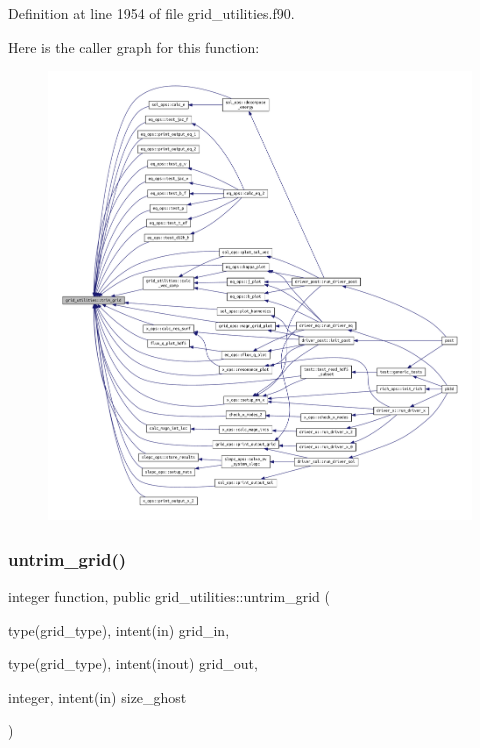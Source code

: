 Definition at line 1954 of file grid\+\_\+utilities.\+f90.

Here is the caller graph for this function\+:
\nopagebreak
\begin{figure}[H]
\begin{center}
\leavevmode
\includegraphics[width=350pt]{namespacegrid__utilities_a67001ff9bbcad707aacf17f90a748d90_icgraph}
\end{center}
\end{figure}
\mbox{\label{namespacegrid__utilities_a4679f24af8e02793070f4e27b43e00b6}} 
\subsubsection{\texorpdfstring{untrim\+\_\+grid()}{untrim\_grid()}}
{\footnotesize\ttfamily integer function, public grid\+\_\+utilities\+::untrim\+\_\+grid (\begin{DoxyParamCaption}\item[{type(grid\+\_\+type), intent(in)}]{grid\+\_\+in,  }\item[{type(grid\+\_\+type), intent(inout)}]{grid\+\_\+out,  }\item[{integer, intent(in)}]{size\+\_\+ghost }\end{DoxyParamCaption})}



